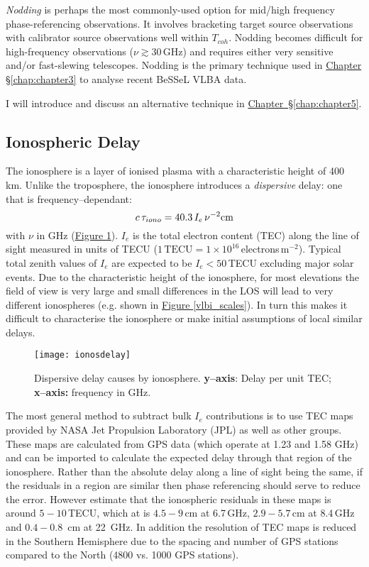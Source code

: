 		\textit{Nodding} is perhaps the most commonly-used option for mid/high frequency phase-referencing observations. It involves bracketing target source observations with calibrator source observations well within $T_{coh}$. Nodding becomes difficult for high-frequency observations ($\nu\gtrsim30$\,GHz) and requires either very sensitive and/or fast-slewing telescopes. Nodding is the primary technique used in \hyperref[chap:chapter3]{Chapter \S\ref*{chap:chapter3}} to analyse recent BeSSeL VLBA data.
		
		I will introduce and discuss an alternative technique in \hyperref[chap:chapter5]{Chapter~\S \ref*{chap:chapter5}}.
	

	\subsection{Ionospheric Delay} \label{sec:ionodelay}
		The ionosphere is a layer of ionised plasma with a characteristic height of 400 km. Unlike the troposphere, the ionosphere introduces a {\it dispersive} delay: one that is frequency--dependant: 
		\begin{equation}
		c\,\tau_{iono}=40.3\,I_e\,\nu^{-2} \space\text{cm}
		\end{equation} with $\nu$ in GHz (\hyperref[fig:ionosdelay]{Figure \ref*{fig:ionosdelay}}). $I_e$ is the total electron content (TEC) along the line of sight measured in units of TECU ($1\,\text{TECU}=1\times10^{16}$\,electrons\,m$^{-2}$). Typical total zenith values of $I_e$ are expected to be $I_e<50$\,TECU excluding major solar events. Due to the characteristic height of the ionosphere, for most elevations the field of view is very large and small differences in the LOS will lead to very different ionospheres (e.g. shown in \hyperref[vlbi_scales]{Figure \ref*{vlbi_scales}}). In turn this makes it difficult to characterise the ionosphere or make initial assumptions of local similar delays. 	
		\begin{figure}
			\texttt{[image: ionosdelay]}
			\caption[Ionospheric Delay vs. Observing Frequency]{Dispersive delay causes by ionosphere. \textbf{y--axis}: Delay per unit TEC; \textbf{x--axis:} frequency in GHz.} %
			\label{fig:ionosdelay}
		\end{figure}		
		The most general method to subtract bulk $I_e$ contributions is to use TEC maps provided by NASA Jet Propulsion Laboratory (JPL) as well as other groups. These maps are calculated from GPS data (which operate at 1.23 and 1.58 GHz) and can be imported to calculate the expected delay through that region of the ionosphere. Rather than the absolute delay along a line of sight being the same, if the residuals in a region are similar then phase referencing should serve to reduce the error. However \citet{WalkerChatterjee1999} estimate that the ionospheric residuals in these maps is around $5-10$\,TECU, which at is $4.5-9$\,cm at 6.7\,GHz, $2.9-5.7$\,cm at 8.4\,GHz and $0.4-0.8$~cm at 22~GHz. In addition the resolution of TEC maps is reduced in the Southern Hemisphere due to the spacing and number of GPS stations compared to the North (4800 vs. 1000 GPS stations).
	
